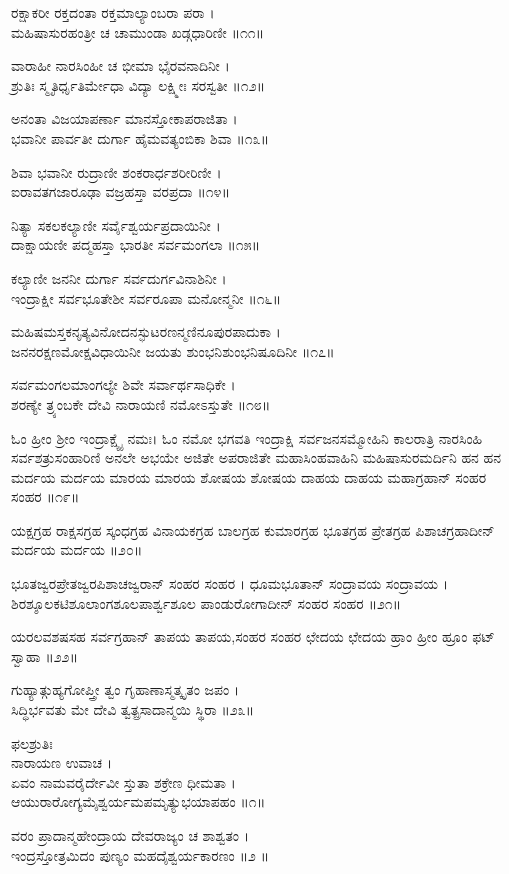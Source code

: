 ರಕ್ಷಾಕರೀ ರಕ್ತದಂತಾ ರಕ್ತಮಾಲ್ಯಾಂಬರಾ ಪರಾ ।\\
ಮಹಿಷಾಸುರಹಂತ್ರೀ ಚ ಚಾಮುಂಡಾ ಖಡ್ಗಧಾರಿಣೀ ॥೧೧॥

ವಾರಾಹೀ ನಾರಸಿಂಹೀ ಚ ಭೀಮಾ ಭೈರವನಾದಿನೀ ।\\
ಶ್ರುತಿಃ ಸ್ಮೃತಿರ್ಧೃತಿರ್ಮೇಧಾ ವಿದ್ಯಾ ಲಕ್ಷ್ಮೀಃ ಸರಸ್ವತೀ ॥೧೨॥

ಅನಂತಾ ವಿಜಯಾಪರ್ಣಾ ಮಾನಸ್ತೋಕಾಪರಾಜಿತಾ ।\\
ಭವಾನೀ ಪಾರ್ವತೀ ದುರ್ಗಾ ಹೈಮವತ್ಯಂಬಿಕಾ ಶಿವಾ ॥೧೩॥

ಶಿವಾ ಭವಾನೀ ರುದ್ರಾಣೀ ಶಂಕರಾರ್ಧಶರೀರಿಣೀ ।\\
ಐರಾವತಗಜಾರೂಢಾ ವಜ್ರಹಸ್ತಾ ವರಪ್ರದಾ ॥೧೪॥

ನಿತ್ಯಾ ಸಕಲಕಲ್ಯಾಣೀ ಸರ್ವೈಶ್ವರ್ಯಪ್ರದಾಯಿನೀ ।\\
ದಾಕ್ಷಾಯಣೀ ಪದ್ಮಹಸ್ತಾ ಭಾರತೀ ಸರ್ವಮಂಗಲಾ ॥೧೫॥

ಕಲ್ಯಾಣೀ ಜನನೀ ದುರ್ಗಾ ಸರ್ವದುರ್ಗವಿನಾಶಿನೀ ।\\
ಇಂದ್ರಾಕ್ಷೀ ಸರ್ವಭೂತೇಶೀ ಸರ್ವರೂಪಾ ಮನೋನ್ಮನೀ ॥೧೬॥

ಮಹಿಷಮಸ್ತಕನೃತ್ಯವಿನೋದನಸ್ಫುಟರಣನ್ಮಣಿನೂಪುರಪಾದುಕಾ ।\\
ಜನನರಕ್ಷಣಮೋಕ್ಷವಿಧಾಯಿನೀ ಜಯತು ಶುಂಭನಿಶುಂಭನಿಷೂದಿನೀ ॥೧೭॥

ಸರ್ವಮಂಗಲಮಾಂಗಲ್ಯೇ ಶಿವೇ ಸರ್ವಾರ್ಥಸಾಧಿಕೇ ।\\
ಶರಣ್ಯೇ ತ್ರ್ಯಂಬಕೇ ದೇವಿ ನಾರಾಯಣಿ ನಮೋಽಸ್ತುತೇ ॥೧೮॥

ಓಂ ಹ್ರೀಂ ಶ್ರೀಂ ಇಂದ್ರಾಕ್ಷ್ಯೈ ನಮಃ। ಓಂ ನಮೋ ಭಗವತಿ ಇಂದ್ರಾಕ್ಷಿ ಸರ್ವಜನಸಮ್ಮೋಹಿನಿ ಕಾಲರಾತ್ರಿ ನಾರಸಿಂಹಿ ಸರ್ವಶತ್ರುಸಂಹಾರಿಣಿ  ಅನಲೇ ಅಭಯೇ  ಅಜಿತೇ ಅಪರಾಜಿತೇ ಮಹಾಸಿಂಹವಾಹಿನಿ ಮಹಿಷಾಸುರಮರ್ದಿನಿ  ಹನ ಹನ ಮರ್ದಯ ಮರ್ದಯ ಮಾರಯ ಮಾರಯ ಶೋಷಯ ಶೋಷಯ ದಾಹಯ ದಾಹಯ ಮಹಾಗ್ರಹಾನ್ ಸಂಹರ ಸಂಹರ ॥೧೯॥

ಯಕ್ಷಗ್ರಹ ರಾಕ್ಷಸಗ್ರಹ ಸ್ಕಂಧಗ್ರಹ ವಿನಾಯಕಗ್ರಹ ಬಾಲಗ್ರಹ ಕುಮಾರಗ್ರಹ ಭೂತಗ್ರಹ ಪ್ರೇತಗ್ರಹ ಪಿಶಾಚಗ್ರಹಾದೀನ್ ಮರ್ದಯ ಮರ್ದಯ ॥೨೦॥

ಭೂತಜ್ವರಪ್ರೇತಜ್ವರಪಿಶಾಚಜ್ವರಾನ್ ಸಂಹರ ಸಂಹರ । ಧೂಮಭೂತಾನ್ ಸಂದ್ರಾವಯ ಸಂದ್ರಾವಯ । ಶಿರಶ್ಶೂಲಕಟಿಶೂಲಾಂಗಶೂಲಪಾರ್ಶ್ವಶೂಲ ಪಾಂಡುರೋಗಾದೀನ್ ಸಂಹರ ಸಂಹರ ॥೨೧॥

ಯರಲವಶಷಸಹ  ಸರ್ವಗ್ರಹಾನ್ ತಾಪಯ ತಾಪಯ,ಸಂಹರ ಸಂಹರ ಛೇದಯ ಛೇದಯ ಹ್ರಾಂ ಹ್ರೀಂ ಹ್ರೂಂ ಫಟ್ ಸ್ವಾಹಾ ॥೨೨॥

ಗುಹ್ಯಾತ್ಗುಹ್ಯಗೋಪ್ತ್ರೀ ತ್ವಂ ಗೃಹಾಣಾಸ್ಮತ್ಕೃತಂ ಜಪಂ ।\\
ಸಿದ್ಧಿರ್ಭವತು ಮೇ ದೇವಿ ತ್ವತ್ಪ್ರಸಾದಾನ್ಮಯಿ ಸ್ಥಿರಾ ॥೨೩॥

ಫಲಶ್ರುತಿಃ\\
ನಾರಾಯಣ ಉವಾಚ ।\\
ಏವಂ ನಾಮವರೈರ್ದೇವೀ ಸ್ತುತಾ ಶಕ್ರೇಣ ಧೀಮತಾ ।\\
ಆಯುರಾರೋಗ್ಯಮೈಶ್ವರ್ಯಮಪಮೃತ್ಯುಭಯಾಪಹಂ ॥೧॥

ವರಂ ಪ್ರಾದಾನ್ಮಹೇಂದ್ರಾಯ ದೇವರಾಜ್ಯಂ ಚ ಶಾಶ್ವತಂ ।\\
ಇಂದ್ರಸ್ತೋತ್ರಮಿದಂ ಪುಣ್ಯಂ ಮಹದೈಶ್ವರ್ಯಕಾರಣಂ ॥೨ ॥

